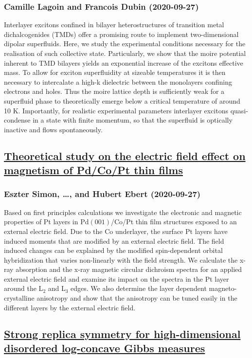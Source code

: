 \subsubsection*{Camille Lagoin and Francois Dubin (2020-09-27)}
Interlayer excitons confined in bilayer heterostructures of transition metal
dichalcogenides (TMDs) offer a promising route to implement two-dimensional
dipolar superfluids. Here, we study the experimental conditions necessary for
the realisation of such collective state. Particularly, we show that the moire
potential inherent to TMD bilayers yields an exponential increase of the
excitons effective mass. To allow for exciton superfluidity at sizeable
temperatures it is then necessary to intercalate a high-k dielectric between
the monolayers confining electrons and holes. Thus the moire lattice depth is
sufficiently weak for a superfluid phase to theoretically emerge below a
critical temperature of around 10 K. Importantly, for realistic experimental
parameters interlayer excitons quasi-condense in a state with finite momentum,
so that the superfluid is optically inactive and flows spontaneously.

\subsection*{\href{http://arxiv.org/abs/2009.12941v1}{Theoretical study on the electric field effect on magnetism of Pd/Co/Pt  thin films}}
\subsubsection*{Eszter Simon, \dots, and Hubert Ebert (2020-09-27)}
Based on first principles calculations we investigate the electronic and
magnetic properties of Pt layers in Pd$(001)$/Co/Pt thin film structures
exposed to an external electric field. Due to the Co underlayer, the surface Pt
layers have induced moments that are modified by an external electric field.
The field induced changes can be explained by the modified spin-dependent
orbital hybridization that varies non-linearly with the field strength. We
calculate the x-ray absorption and the x-ray magnetic circular dichroism
spectra for an applied external electric field and examine its impact on the
spectra in the Pt layer around the L$_{2}$ and L$_{3}$ edges. We also determine
the layer dependent magneto-crystalline anisotropy and show that the anisotropy
can be tuned easily in the different layers by the external electric field.

\subsection*{\href{http://arxiv.org/abs/2009.12939v1}{Strong replica symmetry for high-dimensional disordered log-concave  Gibbs measures}}
